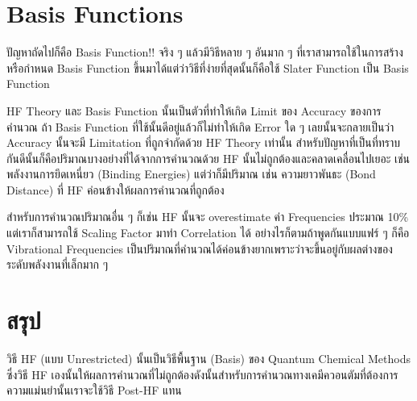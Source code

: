 \section{Basis Functions}

ปัญหาถัดไปก็คือ Basis Function!! จริง ๆ แล้วมีวิธีหลาย ๆ อันมาก ๆ ที่เราสามารถใช้ในการสร้างหรือกำหนด
Basis Function ขึ้นมาได้แต่ว่าวิธีที่ง่ายที่สุดนั้นก็คือใช้ Slater Function เป็น Basis Function

HF Theory และ Basis Function นั้นเป็นตัวที่ทำให้เกิด Limit ของ Accuracy ของการคำนวณ ถ้า Basis
Function ที่ใช้นั้นดีอยู่แล้วก็ไม่ทำให้เกิด Error ใด ๆ เลยนั้นจะกลายเป็นว่า Accuracy นั้นจะมี Limitation
ที่ถูกจำกัดด้วย HF Theory เท่านั้น สำหรับปัญหาที่เป็นที่ทราบกันดีนั้นก็คือปริมาณบางอย่างที่ได้จากการคำนวณด้วย HF
นั้นไม่ถูกต้องและคลาดเคลื่อนไปเยอะ เช่น พลังงานการยึดเหนี่ยว (Binding Energies) แต่ว่าก็มีปริมาณ 
เช่น ความยาวพันธะ (Bond Distance) ที่ HF ค่อนข้างให้ผลการคำนวณที่ถูกต้อง

สำหรับการคำนวณปริมาณอื่น ๆ ก็เช่น HF นั้นจะ overestimate ค่า Frequencies ประมาณ 10\% แต่เราก็สามารถใช้
Scaling Factor มาทำ Correlation ได้ อย่างไรก็ตามถ้าพูดกันแบบแฟร์ ๆ ก็คือ Vibrational Frequencies
เป็นปริมาณที่คำนวณได้ค่อนข้างยากเพราะว่าจะขึ้นอยู่กับผลต่างของระดับพลังงานที่เล็กมาก ๆ

\section{สรุป}

วิธี HF (แบบ Unrestricted) นั้นเป็นวิธีพื้นฐาน (Basis) ของ Quantum Chemical Methods ซึ่งวิธี HF
เองนั้นให้ผลการคำนวณที่ไม่ถูกต้องดังนั้นสำหรับการคำนวณทางเคมีควอนตัมที่ต้องการความแม่นยำนั้นเราจะใช้วิธี
Post-HF แทน
